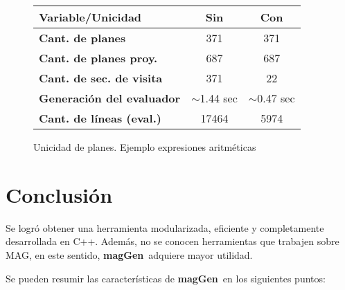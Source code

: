 \documentclass[runningheads,a4paper]{llncs}
\newcommand{\maggen}{\textbf{magGen}}
\begin{document}
\begin{figure}
    \vspace{-0.1cm}
    \begin{center}
        \setlength{\doublerulesep}{0mm}
        \setlength{\arrayrulewidth}{0.9pt}
        \begin{tabular}{|l||c|c|}
            \hline
            \rowcolor{gris} \textbf{Variable/Unicidad}&\textbf{Sin} & \textbf{Con} \\ \hline
            \rowcolor{white}\textbf{Cant. de planes}           & 371                        & 371                         \\ \hline
            \rowcolor{white}\textbf{Cant. de planes proy.}     & 687                        & 687                         \\ \hline
            \rowcolor{white}\textbf{Cant. de sec. de visita }  & \color{red}371             & \color{blue}22              \\ \hline
            \rowcolor{white}\textbf{Generación del evaluador}  & \color{red} $\sim$1.44 sec & \color{blue} $\sim$0.47 sec \\ \hline
            \rowcolor{white}\textbf{Cant. de líneas (eval.)}   & \color{red}17464           & \color{blue}5974            \\ \hline
        \end{tabular}
    \end{center}
    \vspace{-0,5cm}
    \caption{\label{fig:uni_plan}Unicidad de planes. Ejemplo expresiones aritméticas}
\end{figure}

\section{Conclusión}
\vspace{-0.2cm}
Se logró obtener una herramienta modularizada, eficiente y completamente desarrollada en C++. Además, no se conocen herramientas que trabajen sobre MAG, en este sentido, \maggen\ adquiere mayor utilidad. 

Se pueden resumir las características de \maggen\ en los siguientes puntos:
\end{document}
